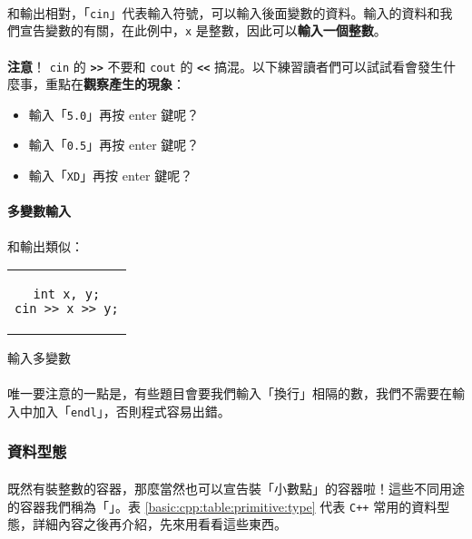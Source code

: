 \documentclass[12pt,a4paper,oneside]{article}
\begin{document}
\begin{CJK}{UTF8}{bkai}
\paragraph{}和輸出相對，「\lstinline!cin!」代表輸入符號，可以輸入後面變數的資料。輸入的資料和我們宣告變數的有關，在此例中，\lstinline!x! 是整數，因此可以\textbf{輸入一個整數}。
\paragraph{}{\color{red}\textbf{注意}}！ \lstinline!cin! 的 \textbf{\lstinline!>>!} 不要和 \lstinline!cout! 的 \textbf{\lstinline!<<!} 搞混。以下練習讀者們可以試試看會發生什麼事，重點在\textbf{觀察產生的現象}：

\begin{itemize}
\item 輸入「\texttt{5.0}」再按 enter 鍵呢？
\item 輸入「\texttt{0.5}」再按 enter 鍵呢？
\item 輸入「\texttt{XD}」再按 enter 鍵呢？
\end{itemize}

\paragraph{多變數輸入}和輸出類似：

\begin{code}[h!]
\centering
\begin{tabular}{c}
\begin{lstlisting}
int x, y;
cin >> x >> y;
\end{lstlisting}
\end{tabular}
\caption{輸入多變數}
\label{basic:cpp:code:cin:variables}
\end{code}

\paragraph{}唯一要注意的一點是，有些題目會要我們輸入「換行」相隔的數，我們不需要在輸入中加入「\lstinline!endl!」，否則程式容易出錯。

\subsubsection{資料型態}

\paragraph{}既然有裝整數的容器，那麼當然也可以宣告裝「小數點」的容器啦！這些不同用途的容器我們稱為「」。表 \ref{basic:cpp:table:primitive:type} 代表 \texttt{C++} 常用的資料型態，詳細內容之後再介紹，先來用看看這些東西。


\end{CJK}
\end{document}
